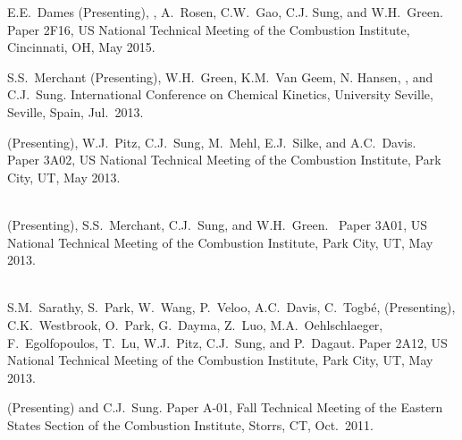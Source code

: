 \begin{bibmune}
\item E.E.\ Dames (Presenting), , A.\ Rosen, C.W.\ Gao, C.J.
        Sung, and W.H.\ Green. 
        Paper 2F16,  US National Technical Meeting of the
        Combustion Institute, Cincinnati, OH, May 2015.

\item S.S.\ Merchant (Presenting), W.H.\ Green, K.M.\ Van Geem, N.
        Hansen, , and C.J.\ Sung.
          International
        Conference on Chemical Kinetics, University Seville, Seville,
        Spain, Jul.\ 2013.

\item {} (Presenting), W.J.\ Pitz, C.J.\ Sung, M.\ Mehl,
        E.J.\ Silke, and A.C.\ Davis.\ 
        Paper 3A02,  US National Technical Meeting of the
        Combustion Institute, Park City, UT, May 2013.\\
        \\

\item {} (Presenting), S.S.\ Merchant, C.J.\ Sung, and
        W.H.\ Green.\  Paper 3A01,  US National
        Technical Meeting of the Combustion Institute, Park City, UT, May
        2013.\\
        \\

\item S.M.\ Sarathy, S.\ Park, W.\ Wang, P.\ Veloo, A.C.\ Davis, C.\ Togbé,
         (Presenting), C.K.\ Westbrook, O.\ Park,
        G.\ Dayma, Z.\ Luo, M.A.\ Oehlschlaeger, F.\ Egolfopoulos, T.\ Lu,
        W.J.\ Pitz, C.J.\ Sung, and P.\ Dagaut. 
        Paper 2A12,  US National Technical Meeting of the
        Combustion Institute, Park City, UT, May 2013.

\item {} (Presenting) and C.J.\ Sung.
         Paper A-01, Fall Technical Meeting of the
        Eastern States Section of the Combustion Institute, Storrs, CT, Oct.\
        2011.\\
        \\


\end{bibmune}
